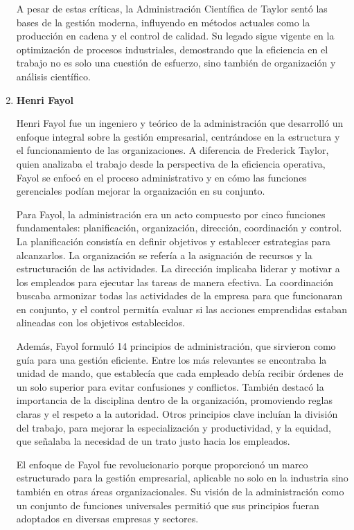 \documentclass[a4paper,oneside,11pt]{article}
\begin{document}
\begin{enumerate}
        A pesar de estas críticas, la Administración Científica de Taylor sentó las bases de la gestión moderna, influyendo en métodos actuales como la producción en cadena y el control de calidad. Su legado sigue vigente en la optimización de procesos industriales, demostrando que la eficiencia en el trabajo no es solo una cuestión de esfuerzo, sino también de organización y análisis científico.

    \item \textbf{Henri Fayol}
    
        Henri Fayol fue un ingeniero y teórico de la administración que desarrolló un enfoque integral sobre la gestión empresarial, centrándose en la estructura y el funcionamiento de las organizaciones. A diferencia de Frederick Taylor, quien analizaba el trabajo desde la perspectiva de la eficiencia operativa, Fayol se enfocó en el proceso administrativo y en cómo las funciones gerenciales podían mejorar la organización en su conjunto.

        Para Fayol, la administración era un acto compuesto por cinco funciones fundamentales: planificación, organización, dirección, coordinación y control. La planificación consistía en definir objetivos y establecer estrategias para alcanzarlos. La organización se refería a la asignación de recursos y la estructuración de las actividades. La dirección implicaba liderar y motivar a los empleados para ejecutar las tareas de manera efectiva. La coordinación buscaba armonizar todas las actividades de la empresa para que funcionaran en conjunto, y el control permitía evaluar si las acciones emprendidas estaban alineadas con los objetivos establecidos.
        
        Además, Fayol formuló 14 principios de administración, que sirvieron como guía para una gestión eficiente. Entre los más relevantes se encontraba la unidad de mando, que establecía que cada empleado debía recibir órdenes de un solo superior para evitar confusiones y conflictos. También destacó la importancia de la disciplina dentro de la organización, promoviendo reglas claras y el respeto a la autoridad. Otros principios clave incluían la división del trabajo, para mejorar la especialización y productividad, y la equidad, que señalaba la necesidad de un trato justo hacia los empleados.
        
        El enfoque de Fayol fue revolucionario porque proporcionó un marco estructurado para la gestión empresarial, aplicable no solo en la industria sino también en otras áreas organizacionales. Su visión de la administración como un conjunto de funciones universales permitió que sus principios fueran adoptados en diversas empresas y sectores.
        

\end{enumerate}
\end{document}
